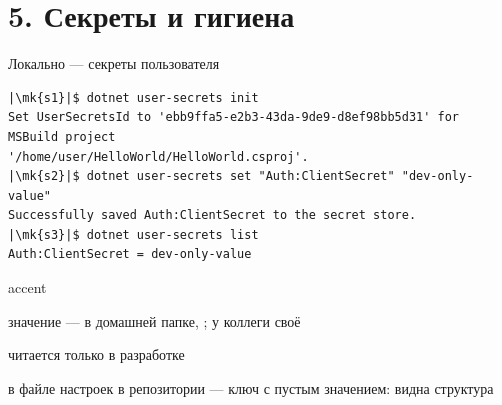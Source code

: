 \documentclass[aspectratio=169,10pt,t]{beamer}
\newcommand{\termsm}{\ttfamily\fontsize{6.6}{7.9}\selectfont}
\newcommand{\mk}[1]{\tikz[remember picture,overlay]\coordinate (#1) at (0,0.55ex);}
\begin{document}
\begin{frame}[plain]
\end{frame}

\section{5. Секреты и гигиена}

\begin{frame}[plain]
\end{frame}

\begin{frame}[fragile]{Локально --- секреты пользователя}
  \slidetop
\begin{lstlisting}[style=term,basicstyle=\termsm,escapechar=|]
|\mk{s1}|$ dotnet user-secrets init
Set UserSecretsId to 'ebb9ffa5-e2b3-43da-9de9-d8ef98bb5d31' for MSBuild project
'/home/user/HelloWorld/HelloWorld.csproj'.
|\mk{s2}|$ dotnet user-secrets set "Auth:ClientSecret" "dev-only-value"
Successfully saved Auth:ClientSecret to the secret store.
|\mk{s3}|$ dotnet user-secrets list
Auth:ClientSecret = dev-only-value
\end{lstlisting}

  \slidegap
  \begin{cbul}{accent}
    \item значение --- в домашней папке, ; у коллеги своё
    \item читается только в разработке
    \item в файле настроек в репозитории --- ключ с пустым значением: видна структура
  \end{cbul}
\end{frame}
\end{document}
